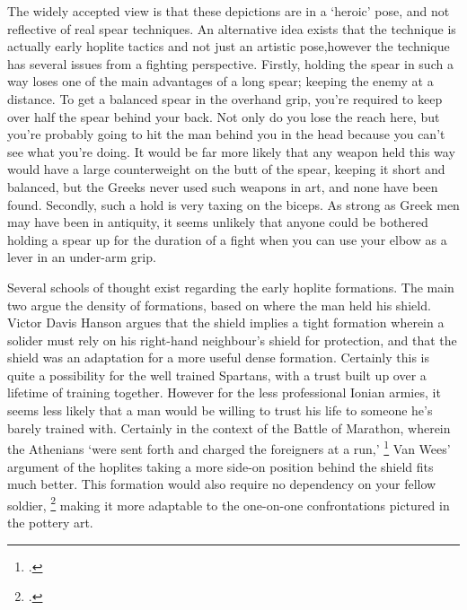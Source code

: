 \documentclass[twoside, a4paper, 12pt]{article}
\begin{document}
\par\vspace{1em}

The widely accepted view is that these depictions are in a `heroic' pose, and not
reflective of real spear techniques. An alternative idea exists
that the technique is actually early hoplite tactics and not just an artistic
pose,\footnotemark[\value{footnote}] however the technique has several issues from
a fighting perspective.
Firstly, holding the spear in such a way loses one of the main advantages of a
long spear; keeping the enemy at a distance.
To get a balanced spear in the overhand grip, you're required
to keep over half the spear behind your back. Not only do you lose the reach here,
but you're probably going to hit the man behind you in the head because you
can't see what you're doing. It would be far more likely that any weapon held
this way would have a large counterweight on the butt of the spear, keeping it short
and balanced, but the Greeks never used such weapons in art, and none have been found.
Secondly, such a hold is very taxing on the biceps. As strong as Greek men may have been
in antiquity, it seems unlikely that anyone could be bothered holding a spear
up for the duration of a fight when you can use your elbow as a lever in
an under-arm grip.

\par\vspace{1em}

Several schools of thought exist regarding the early hoplite formations. The
main two argue the density of formations, based on where the man held his shield.
Victor Davis Hanson argues that the shield implies a tight formation wherein
a solider must rely on his right-hand neighbour's shield for protection, and
that the shield was an adaptation for a more useful dense formation.\footnotemark
{}
Certainly this is quite a possibility for the well trained Spartans, with a
trust built up over a lifetime of training together. However for the less
professional Ionian armies, it seems less likely that a man would be
willing to trust his life to someone he's barely trained with. Certainly
in the context of the Battle of Marathon, wherein the Athenians
`were sent forth and charged the foreigners at a run,'
\footcite[Book 6.112]{herodotus_1920} Van Wees' argument of the hoplites taking
a more side-on position behind the shield fits much better.
This formation would also require no dependency on your
fellow soldier, \footcite[58]{wees_hoplite_bronze} making it more adaptable to
the one-on-one confrontations pictured in the pottery art.
\end{document}
